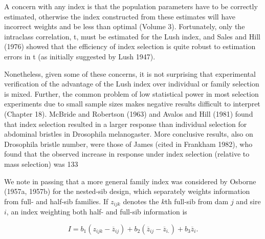 \documentclass{article}
\begin{document}
A concern with any index is that the population parameters have to be correctly estimated, otherwise the index constructed from these estimates will have incorrect weights and be less than optimal (Volume 3). Fortunately, only the intraclass correlation, t, must be estimated for the Lush index, and Sales and Hill (1976) showed that the efficiency of index selection is quite robust to estimation errors in t (as initially suggested by Lush 1947).

Nonetheless, given some of these concerns, it is not surprising that experimental verification of the advantage of the Lush index over individual or family selection is mixed. Further, the common problem of low statistical power in most selection experiments due to small sample sizes makes negative results difficult to interpret (Chapter 18). McBride and Robertson (1963) and Avalos and Hill (1981) found that index selection resulted in a larger response than individual selection for abdominal bristles in Drosophila melanogaster. More conclusive results, also on Drosophila bristle number, were those of James (cited in Frankham 1982), who found that the observed increase in response under index selection (relative to mass selection) was 133%

We note in passing that a more general family index was considered by Osborne (1957a, 1957b) for the nested-sib design, which separately weights information from full- and half-sib families. If  $ z_{ijk} $ denotes the  $ k $th full-sib from dam  $ j $ and sire  $ i $, an index weighting both half- and full-sib information is

\begin{equation}
I=b_{1}\left(z_{i j k}-\overline{{z}}_{i j}\right)+b_{2}\left(\overline{{z}}_{i j}-\overline{{z}}_{i.}\right)+b_{3}\overline{{z}}_{i}.
\end{equation}
\end{document}
